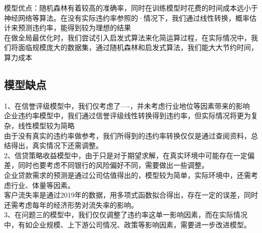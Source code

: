 \documentclass[bwprint]{cumcm}
\begin{document}
模型优点：随机森林有着较高的准确率，同时在训练模型时花费的时间成本远小于神经网络等算法。在没有实际违约率参照的·情况下，我们通过线性转换，概率估计来预测违约率，能得到较为理想的结果
\\
在做全局最优化时，我们尝试引入启发式算法来化简运算过程，在实际情况中，我们将面临规模庞大的数据集，通过随机森林和启发式算法，我们能大大节约时间，算力成本\\


\subsection{\heiti 模型缺点}

 1、在信誉评级模型中，我们仅考虑了----，并未考虑行业地位等因素带来的影响\\企业违约率模型中，我们通过信誉评级线性转换得到违约率，但实际情况将更为复杂，线性模型较为简略\\由于没有真实的违约率做参考，我们所得到的违约率转换仅仅是通过查阅资料，总结得出，真实情况下还需调整。\\

2、信贷策略收益模型中，由于只是对于期望求解，在真实环境中可能存在一定偏差，同时也要考虑不同银行的风险偏好不同，需要做出一些调整。\\
企业贷款需求的预测是通过公司估值得出的，模型较为简单，实际环境中，还需考虑行业、体量等因素。\\
客户流失率是通过2019年的数据，用多项式函数拟合得出，存在一定的误差，同时还需考虑每年的经济形势对流失率的影响。\\


3、在问题三的模型中，我们仅仅调整了违约率这单一影响因素，而在实际情况中，有如企业规模、上下游公司情况、政策等影响因素，需要进一步改进模型。



\newpage
\end{document}
